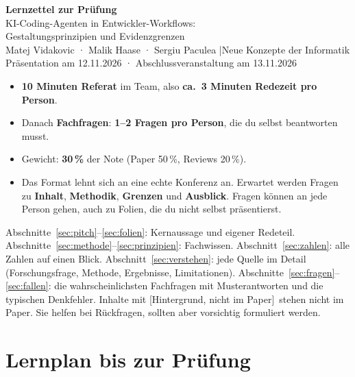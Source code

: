 \documentclass[12pt,a4paper]{article}
\newcommand{\hg}{\textcolor{grau}{\small[Hintergrund, nicht im Paper]}}
\begin{document}
\begin{center}
{\LARGE\bfseries\color{akzent} Lernzettel zur Prüfung}\\[0.5em]
{\Large KI-Coding-Agenten in Entwickler-Workflows:\\Gestaltungsprinzipien und Evidenzgrenzen}\\[0.6em]
{\normalsize Matej Vidakovic · Malik Haase · Sergiu Paculea \quad|\quad Neue Konzepte der Informatik}\\[0.3em]
{\normalsize\color{grau} Präsentation am 12.11.2026 · Abschlussveranstaltung am 13.11.2026}
\end{center}

\begin{merke}
\begin{itemize}
  \item \textbf{10 Minuten Referat} im Team, also \textbf{ca.\ 3 Minuten Redezeit pro Person}.
  \item Danach \textbf{Fachfragen}: \textbf{1--2 Fragen pro Person}, die du selbst beantworten musst.
  \item Gewicht: \textbf{30\,\%} der Note (Paper 50\,\%, Reviews 20\,\%).
  \item Das Format lehnt sich an eine echte Konferenz an. Erwartet werden Fragen zu \textbf{Inhalt}, \textbf{Methodik}, \textbf{Grenzen} und \textbf{Ausblick}. Fragen können an jede Person gehen, auch zu Folien, die du nicht selbst präsentierst.
\end{itemize}
\end{merke}

\begin{tipp}
Abschnitte~\ref{sec:pitch}--\ref{sec:folien}: Kernaussage und eigener Redeteil. Abschnitte~\ref{sec:methode}--\ref{sec:prinzipien}: Fachwissen. Abschnitt~\ref{sec:zahlen}: alle Zahlen auf einen Blick. Abschnitt~\ref{sec:verstehen}: jede Quelle im Detail (Forschungsfrage, Methode, Ergebnisse, Limitationen). Abschnitte~\ref{sec:fragen}--\ref{sec:fallen}: die wahrscheinlichsten Fachfragen mit Musterantworten und die typischen Denkfehler. Inhalte mit \hg\ stehen nicht im Paper. Sie helfen bei Rückfragen, sollten aber vorsichtig formuliert werden.
\end{tipp}

\tableofcontents
\newpage

\section{Lernplan bis zur Prüfung}
\label{sec:lernplan}
\end{document}
